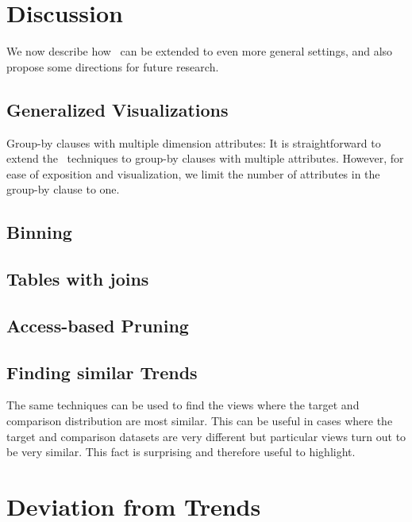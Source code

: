 

\section{Discussion}
\label{sec:discussion}
We now describe how \SeeDB\ can be extended to even more general settings,
and also propose some directions for future research.

\subsection{Generalized Visualizations}\label{sec:discussion:multi-col}

Group-by clauses with multiple dimension attributes: It is
straightforward to extend the \SeeDB\ techniques  to group-by clauses with multiple attributes.
However, for ease of exposition and visualization, we limit the number of
attributes in the group-by clause to one.

\subsection{Binning}

\subsection{Tables with joins}

\subsection{Access-based Pruning}

\subsection{Finding similar Trends}
The same techniques can be used to find the views where the target and
comparison distribution are most similar. 
This can be useful in cases where the target and comparison datasets are very
different but particular views turn out to be very similar.
This fact is surprising and therefore useful to highlight.

\section{Deviation from Trends}

